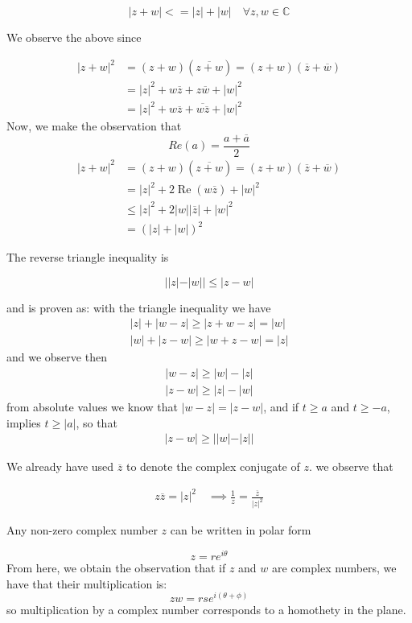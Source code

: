 \documentclass[11pt,twoside]{book}
\newcommand{\CC}{\mathbb{C}}
\newcommand{\conj}[1]{\overline{#1}}
\begin{document}
\[
	| z + w | <= |z| + |w| \quad \forall z,w \in \CC
\]

We observe the above since

\begin{align*}
| z + w |^2 &= (z + w)(\conj{z + w}) = (z+w)(\conj{z} + \conj{w}) \\
&= |z|^2 + w \conj{z} + z \conj{w} + |w|^2 \\
&= |z|^2 + w \conj{z} + \conj{w \conj{z}} + |w|^2 
\end{align*}
Now, we make the observation that 
\[
Re(a) = \frac{a + \conj{a}}{2}
\]
\begin{align*}
| z + w |^2 &= (z + w)(\conj{z + w}) = (z+w)(\conj{z} + \conj{w}) \\
			&= |z|^2 +2 \operatorname{Re}(w \conj{z}) + |w|^2 \\
			&\leq |z|^2 + 2 |w| |\conj{z} | + |w|^2 \\
			&= (|z| + |w|)^2
\end{align*}

The reverse triangle inequality is

\[
	||z|-|w|| \leq |z - w|
\]

and is proven as:
with the triangle inequality we have
\begin{align*}
	|z| + |w-z| \geq |z + w - z| = |w| \\
	|w| + |z-w| \geq |w + z - w | = |z| 
\end{align*}
and we observe then
\begin{align*}
	| w - z | \geq |w| - |z| \\
	| z - w | \geq |z| - |w|
\end{align*}
from absolute values we know that $ | w - z| = | z - w| $, and if $ t \geq a $ and $ t \geq -a$, implies $ t \geq |a| $, so that
\begin{align*}
	| z - w | \geq | |w| - |z| |
\end{align*}

We already have used $\conj{z}$ to denote the complex conjugate of $z$. we observe that

\begin{align*}
z\conj{z} = |z|^2 \quad \implies \frac{1}{z} = \frac{\conj{z}}{|z|^2}
\end{align*}

Any non-zero complex number $z$ can be written in polar form

\[
	z = re^{i \theta} 
\]
From here, we obtain the observation that if $z$ and $w$ are complex numbers, we have that their multiplication is:
\[
 zw = rse^{ i (\theta + \phi) }
\]
so multiplication by a complex number corresponds to a homothety in the plane.
\end{document}
